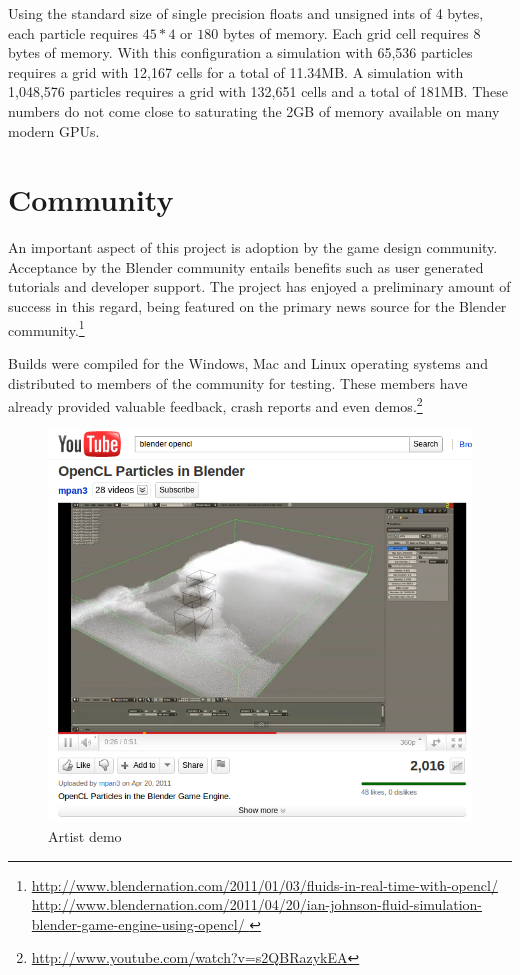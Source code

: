 Using the standard size of single precision floats and unsigned ints of 4
bytes, each particle requires $45*4$ or $180$ bytes of memory. Each grid cell
requires $8$ bytes of memory. With this configuration a simulation with 65,536
particles requires a grid with 12,167 cells for a total of 11.34MB. A
simulation with 1,048,576 particles requires a grid with 132,651 cells and a
total of 181MB. These numbers do not come close to saturating the 2GB of memory
available on many modern GPUs.


\section{Community}
An important aspect of this project is adoption by the game design community.
Acceptance by the Blender community entails benefits such as user generated
tutorials and developer support. The project has enjoyed a preliminary amount
of success in this regard, being featured on the primary news source for
the Blender community.\footnote{
\url{http://www.blendernation.com/2011/01/03/fluids-in-real-time-with-opencl/}
\\ 
\url{
http://www.blendernation.com/2011/04/20/ian-johnson-fluid-simulation-blender-game-engine-using-opencl/
} }

Builds were compiled for the Windows, Mac and Linux operating systems and
distributed to members of the community for testing. These members have already
provided valuable feedback, crash reports and even demos.\footnote{ \url{http://www.youtube.com/watch?v=s2QBRazykEA}} 

\begin{figure}[!htc]
 		\centering
		\includegraphics[scale=0.75]{figures/youtube.png}
        \caption{ Artist demo }
		\label{fig:mpan}
\end{figure}

